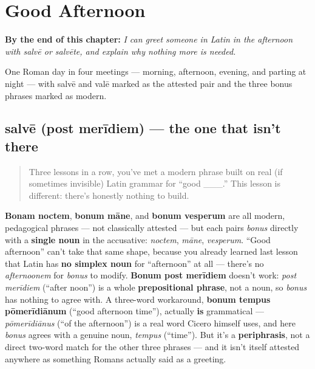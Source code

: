 
\chapter{Good Afternoon}
\label{ch:la-good-afternoon}

\begin{chapteropening}
\textbf{By the end of this chapter:} \emph{I can greet someone in Latin in the afternoon with salvē or salvēte, and explain why nothing more is needed.}

One Roman day in four meetings — morning, afternoon, evening, and parting at night — with salvē and valē marked as the attested pair and the three bonus phrases marked as modern.
\end{chapteropening}

\section[salvē (post merīdiem)]{salvē (post merīdiem) — the one that isn't there}

\label{lesson:LA-C36-salve-post-meridiem}



\begin{quote}
Three lessons in a row, you've met a modern phrase built on real (if sometimes invisible) Latin grammar for \textquotedblleft{}good \_\_\_.\textquotedblright{} This lesson is different: there's honestly nothing to build.
\end{quote}

\begin{culture}
\textbf{Bonam noctem}, \textbf{bonum māne}, and \textbf{bonum vesperum} are all modern, pedagogical phrases — not classically attested — but each pairs \emph{bonus} directly with a \textbf{single noun} in the accusative: \emph{noctem}, \emph{māne}, \emph{vesperum}. \textquotedblleft{}Good afternoon\textquotedblright{} can't take that same shape, because you already learned last lesson that Latin has \textbf{no simplex noun} for \textquotedblleft{}afternoon\textquotedblright{} at all — there's no \emph{afternoonem} for \emph{bonus} to modify. \textbf{Bonum post merīdiem} doesn't work: \emph{post merīdiem} (\textquotedblleft{}after noon\textquotedblright{}) is a whole \textbf{prepositional phrase}, not a noun, so \emph{bonus} has nothing to agree with. A three-word workaround, \textbf{bonum tempus pōmerīdiānum} (\textquotedblleft{}good afternoon time\textquotedblright{}), actually \textbf{is} grammatical — \emph{pōmerīdiānus} (\textquotedblleft{}of the afternoon\textquotedblright{}) is a real word Cicero himself uses, and here \emph{bonus} agrees with a genuine noun, \emph{tempus} (\textquotedblleft{}time\textquotedblright{}). But it's a \textbf{periphrasis}, not a direct two-word match for the other three phrases — and it isn't itself attested anywhere as something Romans actually said as a greeting.
\end{culture}

